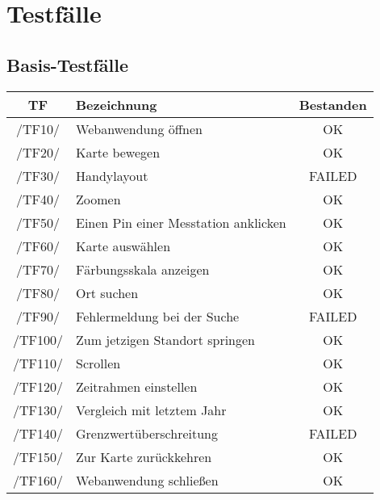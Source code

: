 \section{Testfälle}
\subsection{Basis-Testfälle}
\begin{center}
    \begin{tabular}[h]{|c|l|c|}
        \hline
        \textbf{TF} & \textbf{Bezeichnung} & \textbf{Bestanden} \\
        \hline
        /TF10/ & Webanwendung öffnen & \cellcolor{green!25}OK \\
        \hline
        /TF20/ & Karte bewegen & \cellcolor{green!25}OK \\
        \hline
        /TF30/ & Handylayout & \cellcolor{red!25}FAILED \\
        \hline
        /TF40/ & Zoomen & \cellcolor{green!25}OK \\
        \hline
         /TF50/ & Einen Pin einer Messtation anklicken & \cellcolor{green!25}OK \\
        \hline
        /TF60/ & Karte auswählen & \cellcolor{green!25}OK \\
        \hline
        /TF70/ & Färbungsskala anzeigen & \cellcolor{green!25}OK \\
        \hline
         /TF80/ & Ort suchen & \cellcolor{green!25}OK \\
        \hline
         /TF90/ & Fehlermeldung bei der Suche & \cellcolor{red!25}FAILED \\
        \hline
        /TF100/ & Zum jetzigen Standort springen & \cellcolor{green!25}OK \\
        \hline
        /TF110/ & Scrollen & \cellcolor{green!25}OK \\
        \hline
         /TF120/ & Zeitrahmen einstellen & \cellcolor{green!25}OK \\
        \hline
         /TF130/ & Vergleich mit letztem Jahr & \cellcolor{green!25}OK \\
        \hline
         /TF140/ & Grenzwertüberschreitung & \cellcolor{red!25}FAILED \\
        \hline
        /TF150/ & Zur Karte zurückkehren & \cellcolor{green!25}OK \\
        \hline
         /TF160/ & Webanwendung schließen & \cellcolor{green!25}OK \\
        \hline

    \end{tabular}
\end{center}

